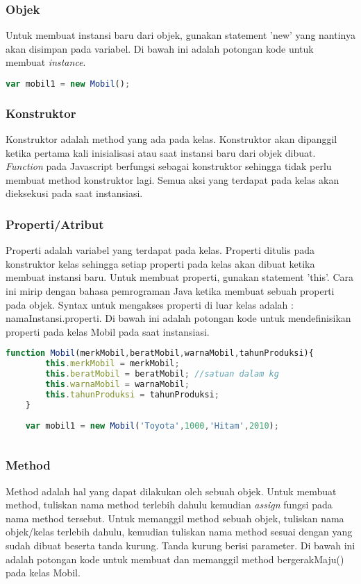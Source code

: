 \subsubsection{Objek}
Untuk membuat instansi baru dari objek, gunakan statement 'new' yang nantinya akan disimpan pada variabel. Di bawah ini adalah potongan kode untuk membuat \textit{instance}.

\begin{lstlisting}[language=Javascript, caption=Membuat \textit{instance} mobil]
	var mobil1 = new Mobil();
\end{lstlisting}

\subsubsection{Konstruktor}
Konstruktor adalah method yang ada pada kelas. Konstruktor akan dipanggil ketika pertama kali inisialisasi atau saat instansi baru dari objek dibuat. \textit{Function} pada Javascript berfungsi sebagai konstruktor sehingga tidak perlu membuat method konstruktor lagi. Semua aksi yang terdapat pada kelas akan dieksekusi pada saat instansiasi.

\subsubsection{Properti/Atribut}
Properti adalah variabel yang terdapat pada kelas. Properti ditulis pada konstruktor kelas sehingga setiap properti pada kelas akan dibuat ketika membuat instansi baru. Untuk membuat properti, gunakan statement 'this'. Cara ini mirip dengan bahasa pemrograman Java ketika membuat sebuah properti pada objek. Syntax untuk mengakses properti di luar kelas adalah : namaInstansi.properti. Di bawah ini adalah potongan kode untuk mendefinisikan properti pada kelas Mobil pada saat instansiasi.

\begin{lstlisting}[language=Javascript, caption=Mendefinisikan properti pada kelas Mobil]
	function Mobil(merkMobil,beratMobil,warnaMobil,tahunProduksi){
		this.merkMobil = merkMobil;
		this.beratMobil = beratMobil; //satuan dalam kg
		this.warnaMobil = warnaMobil;
		this.tahunProduksi = tahunProduksi;
	}
	
	var mobil1 = new Mobil('Toyota',1000,'Hitam',2010);
	
\end{lstlisting}

\subsubsection{Method}
Method adalah hal yang dapat dilakukan oleh sebuah objek. Untuk membuat method, tuliskan nama method terlebih dahulu kemudian \textit{assign} fungsi pada nama method tersebut. Untuk memanggil method sebuah objek, tuliskan nama objek/kelas terlebih dahulu, kemudian tuliskan nama method sesuai dengan yang sudah dibuat beserta tanda kurung. Tanda kurung berisi parameter. Di bawah ini adalah potongan kode untuk membuat dan memanggil method bergerakMaju() pada kelas Mobil.

